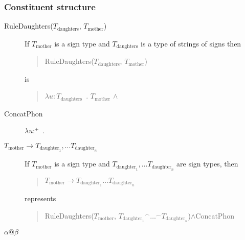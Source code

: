 \subsubsection{Constituent structure} 
\begin{description}
  
  
\item[\textnormal{RuleDaughters($T_{\text{daughters}}$,
$T_{\text{mother}}$)}] \mbox{}

If $T_{\text{mother}}$ is a sign type and $T_{\text{daughters}}$ is a
type of strings of signs then
\begin{quote}
RuleDaughters($T_{\text{daughters}}$,
$T_{\text{mother}}$)
\end{quote}
is
\begin{quote}
  $\lambda u\! :\! T_{\text{daughters}}$\ . $T_{\text{mother}}$ \d{$\wedge$} 
\end{quote}

\item[\textnormal{ConcatPhon}] \mbox{}

  $\lambda
u$:$^+$\
. \\
\hspace*{1em}

\item[\textnormal{$T_{\text{mother}}\longrightarrow T_{\text{daughter}_1},\ldots
    T_{\text{daughter}_n}$}] \mbox{}

  If $T_{\text{mother}}$ is a sign type and
  $T_{\text{daughter}_1},\ldots T_{\text{daughter}_n}$ are sign types,
  then
  \begin{quote}
    $T_{\text{mother}}\longrightarrow T_{\text{daughter}_1}\ldots
    T_{\text{daughter}_n}$
  \end{quote}
  represents
  \begin{quote}
RuleDaughters($T_{\text{mother}}$,
${T_{\text{daughter}_1}}^\frown\ldots^\frown T_{\text{daughter}_n}$)\d{\d{$\wedge$}}ConcatPhon 
\end{quote}


\item[\textnormal{$\alpha\text{@}\beta$}] \mbox{}


\end{description}
